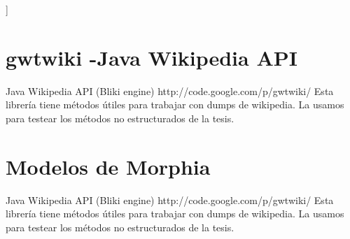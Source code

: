 \bigskip
[[Dar ejemplos de una query]]
\bigskip

\section{gwtwiki -Java Wikipedia API}\label{sec:gwtwiki}

Java Wikipedia API (Bliki engine)
http://code.google.com/p/gwtwiki/
Esta librer\'ia tiene m\'etodos \'utiles para trabajar con dumps de wikipedia. La usamos para testear los m\'etodos no estructurados de la tesis.


\section{Modelos de Morphia}\label{sec:modelos-morphia}

Java Wikipedia API (Bliki engine)
http://code.google.com/p/gwtwiki/
Esta librer\'ia tiene m\'etodos \'utiles para trabajar con dumps de wikipedia. La usamos para testear los m\'etodos no estructurados de la tesis.
